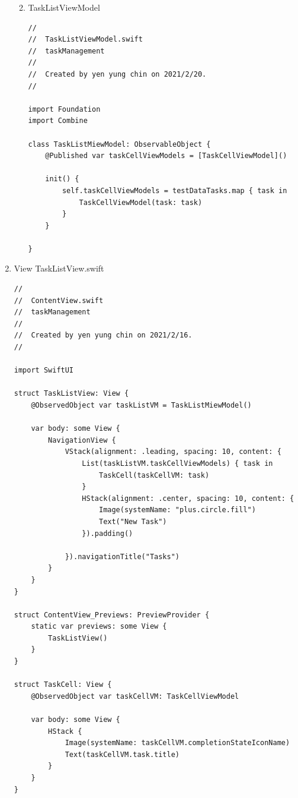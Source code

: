 \documentclass[a4paper,12pt]{article}
\begin{document}
\begin{enumerate}
\begin{enumerate}
\begin{lstlisting}
\end{lstlisting}
\item TaskListViewModel
\label{sec:org1698a7d}
\lstset{breaklines=true,language=swift,label= ,caption= ,captionpos=b,firstnumber=1,numbers=left}
\begin{lstlisting}
//
//  TaskListViewModel.swift
//  taskManagement
//
//  Created by yen yung chin on 2021/2/20.
//

import Foundation
import Combine

class TaskListMiewModel: ObservableObject {
    @Published var taskCellViewModels = [TaskCellViewModel]()

    init() {
        self.taskCellViewModels = testDataTasks.map { task in
            TaskCellViewModel(task: task)
        }
    }

}

\end{lstlisting}
\end{enumerate}
\item View
\label{sec:orge9e8731}
TaskListView.swift\\
\lstset{breaklines=true,language=swift,label= ,caption= ,captionpos=b,firstnumber=1,numbers=left}
\begin{lstlisting}
//
//  ContentView.swift
//  taskManagement
//
//  Created by yen yung chin on 2021/2/16.
//

import SwiftUI

struct TaskListView: View {
    @ObservedObject var taskListVM = TaskListMiewModel()

    var body: some View {
        NavigationView {
            VStack(alignment: .leading, spacing: 10, content: {
                List(taskListVM.taskCellViewModels) { task in
                    TaskCell(taskCellVM: task)
                }
                HStack(alignment: .center, spacing: 10, content: {
                    Image(systemName: "plus.circle.fill")
                    Text("New Task")
                }).padding()

            }).navigationTitle("Tasks")
        }
    }
}

struct ContentView_Previews: PreviewProvider {
    static var previews: some View {
        TaskListView()
    }
}

struct TaskCell: View {
    @ObservedObject var taskCellVM: TaskCellViewModel

    var body: some View {
        HStack {
            Image(systemName: taskCellVM.completionStateIconName)
            Text(taskCellVM.task.title)
        }
    }
}

\end{lstlisting}
\end{enumerate}
\end{document}

